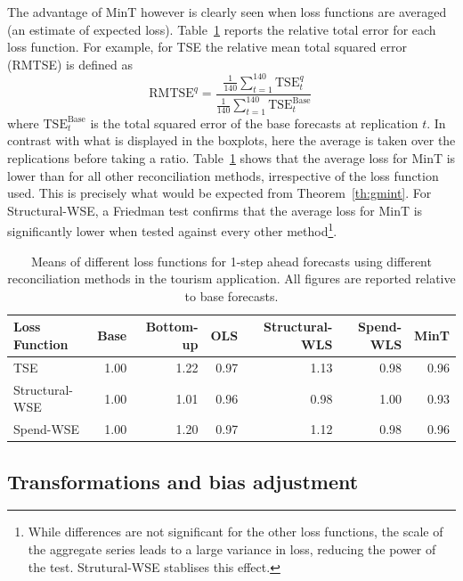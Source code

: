 \documentclass[12pt]{article}
\theoremstyle{definition}
\begin{document}
{\color{blue}
The advantage of MinT however is clearly seen when loss functions are averaged (an estimate of expected loss). Table~\ref{tab:lossVmethods} reports the relative total error for each loss function. For example, for TSE the relative mean total squared error (RMTSE) is defined as
\begin{equation}
\textrm{RMTSE}^{q}=\frac{\frac{1}{140}\sum\limits_{t=1}^{140}\textrm{TSE}^{q}_t}{\frac{1}{140}\sum\limits_{t=1}^{140}\textrm{TSE}^{\textrm{Base}}_t}\,\label{eq:RTSE}
\end{equation}
where $\textrm{TSE}^{\textrm{Base}}_t$ is the total squared error of the base forecasts at replication $t$.  In contrast with what is displayed in the boxplots, here the average is taken over the replications before taking a ratio.  Table~\ref{tab:lossVmethods} shows that the average loss for MinT is lower than for all other reconciliation methods, irrespective of the loss function used.  This is precisely what would be expected from Theorem~\ref{th:gmint}. For Structural-WSE, a Friedman test confirms that the average loss for MinT is significantly lower when tested against every other method\footnote{{\color{blue} While differences are not significant for the other loss functions, the scale of the aggregate series leads to a large variance in loss, reducing the power of the test.  Strutural-WSE stablises this effect.}}.
}

\begin{table}[ht]
	\centering
{\color{blue}	
	\begin{tabular}{lrrrrrr}
		\hline
		Loss Function & Base & Bottom-up & OLS & Structural-WLS & Spend-WLS & MinT \\
		\hline
		TSE & 1.00 & 1.22 & 0.97 & 1.13 & 0.98 & 0.96 \\
		Structural-WSE & 1.00 & 1.01 & 0.96 & 0.98 & 1.00 & 0.93 \\
		Spend-WSE & 1.00 & 1.20 & 0.97 & 1.12 & 0.98 & 0.96 \\
		\hline
    \end{tabular}
}
	\caption{{\color{blue}Means of different loss functions for 1-step ahead forecasts using different reconciliation methods in the tourism application.  All figures are reported relative to base forecasts.}}
	\label{tab:lossVmethods}
\end{table}


\subsection{Transformations and bias adjustment}
\end{document}
